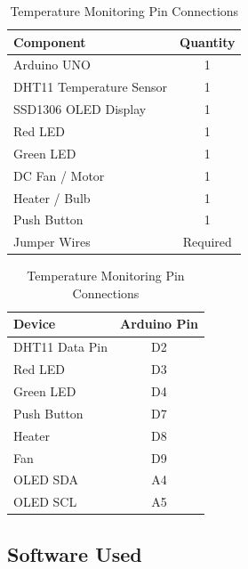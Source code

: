 \begin{table}[H]
\centering

\begin{minipage}[t]{0.55\textwidth}
\centering
\caption{Temperature Monitoring Components}
\label{tab:temp_components}

\begin{tabular}{|p{5cm}|c|}
\hline
\textbf{Component} & \textbf{Quantity} \\
\hline
Arduino UNO & 1 \\
DHT11 Temperature Sensor & 1 \\
SSD1306 OLED Display & 1 \\
Red LED & 1 \\
Green LED & 1 \\
DC Fan / Motor & 1 \\
Heater / Bulb & 1 \\
Push Button & 1 \\
Jumper Wires & Required \\
\hline
\end{tabular}

\end{minipage}
\hfill
\begin{minipage}[t]{0.40\textwidth}
\centering
\caption{Temperature Monitoring Pin Connections}
\label{tab:temp_pins}

\begin{tabular}{|l|c|}
\hline
\textbf{Device} & \textbf{Arduino Pin} \\
\hline
DHT11 Data Pin & D2 \\
Red LED & D3 \\
Green LED & D4 \\
Push Button & D7 \\
Heater & D8 \\
Fan & D9 \\
OLED SDA & A4 \\
OLED SCL & A5 \\
\hline
\end{tabular}

\end{minipage}

\end{table}

\clearpage
\subsection{Software Used}

